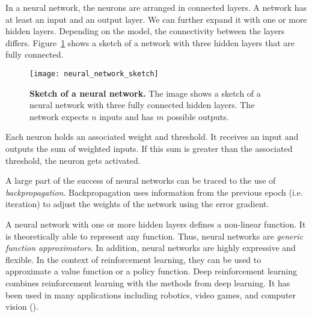 In a neural network, the neurons are arranged in connected layers. A network has at least an input and an output layer. We can further expand it with one or more hidden layers. Depending on the model, the connectivity between the layers differs. Figure~\ref{fig:neural_network_sketch} shows a sketch of a network with three hidden layers that are fully connected.
\begin{figure}[ht]
\centering
\texttt{[image: neural\_network\_sketch]}
\caption[Sketch of a Neural Network]{
  \textbf{Sketch of a neural network.}
  The image shows a sketch of a neural network with three fully connected hidden layers. The network expects $n$ inputs and has $m$ possible outputs.
}
\label{fig:neural_network_sketch}
\end{figure}
Each neuron holds an associated weight and threshold. It receives an input and outputs the sum of weighted inputs. If this sum is greater than the associated threshold, the neuron gets activated.

A large part of the success of neural networks can be traced to the use of \textit{backpropagation}. Backpropagation uses information from the previous epoch (i.e. iteration) to adjust the weights of the network using the error gradient.

A neural network with one or more hidden layers defines a non-linear function. It is theoretically able to represent any function. Thus, neural networks are \textit{generic function approximators}. In addition, neural networks are highly expressive and flexible. In the context of reinforcement learning, they can be used to approximate a value function or a policy function. Deep reinforcement learning combines reinforcement learning with the methods from deep learning. It has been used in many applications including robotics, video games, and computer vision (\cite{franccois2018introduction}).


